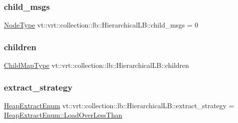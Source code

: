 \subsubsection{\texorpdfstring{child\+\_\+msgs}{child\_msgs}}
{\footnotesize\ttfamily \hyperlink{namespacevt_a866da9d0efc19c0a1ce79e9e492f47e2}{Node\+Type} vt\+::vrt\+::collection\+::lb\+::\+Hierarchical\+L\+B\+::child\+\_\+msgs = 0\hspace{0.3cm}{\ttfamily [private]}}

\mbox{\label{structvt_1_1vrt_1_1collection_1_1lb_1_1_hierarchical_l_b_af79c0b7d47eb39f311a1a604863bd6c4}} 
\subsubsection{\texorpdfstring{children}{children}}
{\footnotesize\ttfamily \hyperlink{structvt_1_1vrt_1_1collection_1_1lb_1_1_hierarchical_l_b_a95e5a93033703216cad8ec7a3da7a2ef}{Child\+Map\+Type} vt\+::vrt\+::collection\+::lb\+::\+Hierarchical\+L\+B\+::children\hspace{0.3cm}{\ttfamily [private]}}

\mbox{\label{structvt_1_1vrt_1_1collection_1_1lb_1_1_hierarchical_l_b_a3bbe0e2597f6c01024f058d20ae9d26e}} 
\subsubsection{\texorpdfstring{extract\+\_\+strategy}{extract\_strategy}}
{\footnotesize\ttfamily \hyperlink{namespacevt_1_1vrt_1_1collection_1_1lb_aeb0f47cf4b89bed7ea05462d0c2e5b5e}{Heap\+Extract\+Enum} vt\+::vrt\+::collection\+::lb\+::\+Hierarchical\+L\+B\+::extract\+\_\+strategy = \hyperlink{namespacevt_1_1vrt_1_1collection_1_1lb_aeb0f47cf4b89bed7ea05462d0c2e5b5ea41a33133c182e43b9dfc2599f39eaa94}{Heap\+Extract\+Enum\+::\+Load\+Over\+Less\+Than}\hspace{0.3cm}{\ttfamily [private]}}

